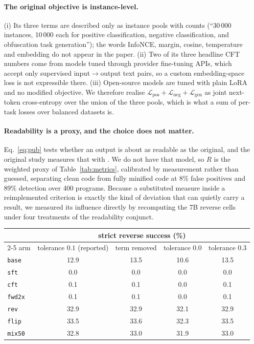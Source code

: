 \documentclass{article}
\newcommand{\arm}[1]{\texttt{#1}}
\begin{document}
\paragraph{The original objective is instance-level.} (i) Its three terms are described
only as instance pools with counts (``30\,000 instances, 10\,000 each for positive
classification, negative classification, and obfuscation task generation''); the words
InfoNCE, margin, cosine, temperature and embedding do not appear in the paper. (ii) Two of
its three headline CFT numbers come from models tuned through provider fine-tuning APIs,
which accept only supervised input$\rightarrow$output text pairs, so a custom
embedding-space loss is not expressible there. (iii) Open-source models are tuned with
plain LoRA and no modified objective. We therefore realise
$\mathcal{L}_{\mathrm{pos}}+\mathcal{L}_{\mathrm{neg}}+\mathcal{L}_{\mathrm{gen}}$ as
joint next-token cross-entropy over the union of the three pools, which is what a sum of
per-task losses over balanced datasets is.

\paragraph{Readability is a proxy, and the choice does not matter.} Eq.~\eqref{eq:pub} tests
whether an output is about as readable as the original, and the original study measures that
with \citet{scalabrino2018comprehension}. We do not have that model, so $R$ is the weighted
proxy of Table~\ref{tab:metrics}, calibrated by measurement rather than guessed, separating
clean code from fully minified code at 8\% false positives and 89\% detection over 400
programs. Because a substituted measure inside a reimplemented criterion is exactly the kind
of deviation that can quietly carry a result, we measured its influence directly by
recomputing the 7B reverse cells under four treatments of the readability conjunct.

\begin{center}\small
\begin{tabular}{lcccc}
\toprule
& \multicolumn{4}{c}{strict reverse success (\%)} \\
\cmidrule(lr){2-5}
arm & tolerance $0.1$ (reported) & term removed & tolerance $0.0$ & tolerance $0.3$ \\
\midrule
\arm{base}  & 12.9 & 13.5 & 10.6 & 13.5 \\
\arm{sft}   & 0.0 & 0.0 & 0.0 & 0.0 \\
\arm{cft}   & 0.1 & 0.1 & 0.0 & 0.1 \\
\arm{fwd2x} & 0.1 & 0.1 & 0.0 & 0.1 \\
\arm{rev}   & 32.9 & 32.9 & 32.1 & 32.9 \\
\arm{flip}  & 33.5 & 33.6 & 32.3 & 33.5 \\
\arm{mix50} & 32.8 & 33.0 & 31.9 & 33.0 \\
\bottomrule
\end{tabular}
\end{center}
\end{document}
